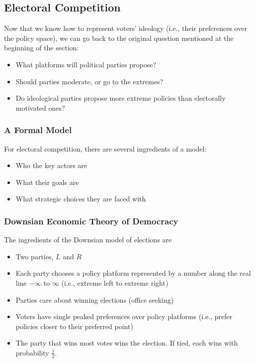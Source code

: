 \documentclass[letterpaper]{article}
\begin{document}
\subsection{Electoral Competition}
Now that we know how to represent voters' ideology (i.e., their preferences over the policy space), we can go back to the original question mentioned at the beginning of the section: 
\begin{mdframed}
    \begin{itemize}
        \item What platforms will political parties propose? 
        \item Should parties moderate, or go to the extremes? 
        \item Do ideological parties propose more extreme policies than electorally motivated ones?
    \end{itemize}
\end{mdframed}

\subsubsection{A Formal Model}
For electoral competition, there are several ingredients of a model: 
\begin{itemize}
    \item Who the key actors are 
    \item What their goals are 
    \item What strategic choices they are faced with 
\end{itemize}

\subsubsection{Downsian Economic Theory of Democracy}
The ingredients of the Downsian model of elections are 
\begin{itemize}
    \item Two parties, $L$ and $R$ 
    \item Each party chooses a policy platform represented by a number along the real line $-\infty$ to $\infty$ (i.e., extreme left to extreme right)
    \item Parties care about winning elections (office seeking)
    \item Voters have single peaked preferences over policy platforms (i.e., prefer policies closer to their preferred point)
    \item The party that wins most votes wins the election. If tied, each wins with probability $\frac{1}{2}$. 
\end{itemize}
\end{document}
